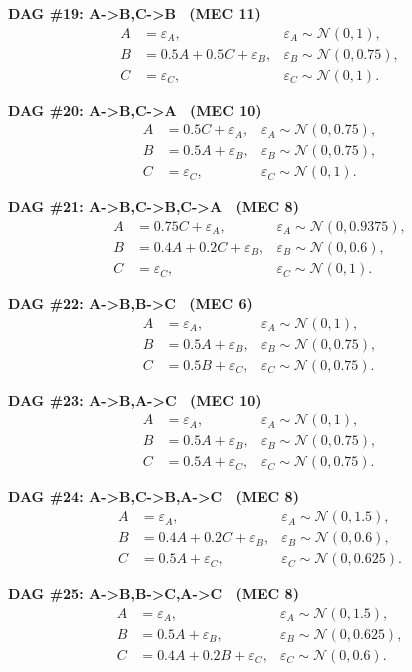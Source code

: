 \documentclass[11pt]{article}
\begin{document}
\noindent\textbf{DAG \#19: A->B,C->B \ (MEC 11)}
\begin{align*}
A &= \varepsilon_A, & \varepsilon_A \sim \mathcal{N}(0, 1),\\B &= 0.5 A + 0.5 C + \varepsilon_B, & \varepsilon_B \sim \mathcal{N}(0, 0.75),\\C &= \varepsilon_C, & \varepsilon_C \sim \mathcal{N}(0, 1).
\end{align*}

\noindent\textbf{DAG \#20: A->B,C->A \ (MEC 10)}
\begin{align*}
A &= 0.5 C + \varepsilon_A, & \varepsilon_A \sim \mathcal{N}(0, 0.75),\\B &= 0.5 A + \varepsilon_B, & \varepsilon_B \sim \mathcal{N}(0, 0.75),\\C &= \varepsilon_C, & \varepsilon_C \sim \mathcal{N}(0, 1).
\end{align*}

\noindent\textbf{DAG \#21: A->B,C->B,C->A \ (MEC 8)}
\begin{align*}
A &= 0.75 C + \varepsilon_A, & \varepsilon_A \sim \mathcal{N}(0, 0.9375),\\B &= 0.4 A + 0.2 C + \varepsilon_B, & \varepsilon_B \sim \mathcal{N}(0, 0.6),\\C &= \varepsilon_C, & \varepsilon_C \sim \mathcal{N}(0, 1).
\end{align*}

\noindent\textbf{DAG \#22: A->B,B->C \ (MEC 6)}
\begin{align*}
A &= \varepsilon_A, & \varepsilon_A \sim \mathcal{N}(0, 1),\\B &= 0.5 A + \varepsilon_B, & \varepsilon_B \sim \mathcal{N}(0, 0.75),\\C &= 0.5 B + \varepsilon_C, & \varepsilon_C \sim \mathcal{N}(0, 0.75).
\end{align*}

\noindent\textbf{DAG \#23: A->B,A->C \ (MEC 10)}
\begin{align*}
A &= \varepsilon_A, & \varepsilon_A \sim \mathcal{N}(0, 1),\\B &= 0.5 A + \varepsilon_B, & \varepsilon_B \sim \mathcal{N}(0, 0.75),\\C &= 0.5 A + \varepsilon_C, & \varepsilon_C \sim \mathcal{N}(0, 0.75).
\end{align*}

\noindent\textbf{DAG \#24: A->B,C->B,A->C \ (MEC 8)}
\begin{align*}
A &= \varepsilon_A, & \varepsilon_A \sim \mathcal{N}(0, 1.5),\\B &= 0.4 A + 0.2 C + \varepsilon_B, & \varepsilon_B \sim \mathcal{N}(0, 0.6),\\C &= 0.5 A + \varepsilon_C, & \varepsilon_C \sim \mathcal{N}(0, 0.625).
\end{align*}

\noindent\textbf{DAG \#25: A->B,B->C,A->C \ (MEC 8)}
\begin{align*}
A &= \varepsilon_A, & \varepsilon_A \sim \mathcal{N}(0, 1.5),\\B &= 0.5 A + \varepsilon_B, & \varepsilon_B \sim \mathcal{N}(0, 0.625),\\C &= 0.4 A + 0.2 B + \varepsilon_C, & \varepsilon_C \sim \mathcal{N}(0, 0.6).
\end{align*}
\end{document}
